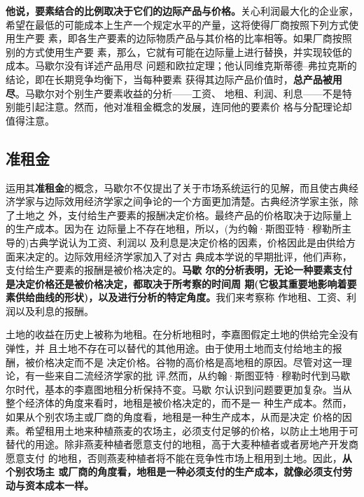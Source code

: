 \textbf{他说，要素结合的比例取决于它们的边际产品与价格。}关心利润最大化的企业家，
希望在最低的可能成本上生产一个规定水平的产量，这将使得厂商按照下列方式使用生产要
素，即各生产要素的边际物质产品与其价格的比率相等。如果厂商按照别的方式使用生产要
素，那么，它就有可能在边际量上进行替换，并实现较低的成本。马歇尔没有详述产品用尽
问题和欧拉定理；他认同维克斯蒂德--弗拉克斯的结论，即在长期竞争均衡下，当每种要素
获得其边际产品价值时，\textbf{总产品被用尽}。马歇尔对个别生产要素收益的分析——工资、
地租、利润、利息——不是特别能引起注意。然而，他对准租金概念的发展，连同他的要素价
格与分配理论却值得注意。

\subsection{准租金}

运用其\textbf{准租金}的概念，马歇尔不仅提出了关于市场系统运行的见解，而且使古典经
济学家与边际效用经济学家之间争论的一个方面更加清楚。古典经济学家主张，除了土地之
外，支付给生产要素的报酬决定价格。最终产品的价格取决于边际量上的生产成本。因为在
边际量上不存在地租，所以，(为约翰·斯图亚特·穆勒所主导的)古典学说认为工资、利润以
及利息是决定价格的因素，价格因此是由供给方面来决定的。边际效用经济学家加入了对古
典成本学说的早期批评，他们声称，支付给生产要素的报酬是被价格决定的。\textbf{马歇
  尔的分析表明，无论一种要素支付是决定价格还是被价格决定，都取决于所考察的时间周
  期(它极其重要地影响着要素供给曲线的形状)，以及进行分析的特定角度。}我们来考察称
作地租、工资、利润以及利息的报酬。

土地的收益在历史上被称为地租。在分析地租时，李嘉图假定土地的供给完全没有弹性，并
且土地不存在可以替代的其他用途。由于使用土地而支付给地主的报酬，被价格决定而不是
决定价格。谷物的高价格是高地租的原因。尽管对这一理论，有一些来自二流经济学家的批
评,然而，从约翰·斯图亚特·穆勒时代到马歇尔时代，基本的李嘉图地租分析保持不变。马歇
尔认识到问题要更加复杂。当从整个经济体的角度来看时，地租是被价格决定的，而不是一
种生产成本。然而，如果从个别农场主或厂商的角度看，地租是一种生产成本，从而是决定
价格的因素。希望租用土地来种植燕麦的农场主，必须支付足够的价格，以防止土地用于可
替代的用途。除非燕麦种植者愿意支付的地租，高于大麦种植者或者房地产开发商愿意支付
的地租，否则燕麦种植者将不能在竞争性市场上租用到土地。因此，\textbf{从个别农场主
  或厂商的角度看，地租是一种必须支付的生产成本，就像必须支付劳动与资本成本一样。}

